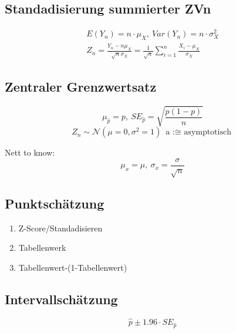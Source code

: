 \documentclass[10pt,a4paper,landscape]{article}
\begin{document}
\begin{multicols}{4}
\subsection{Standadisierung summierter ZVn}
\begin{align*}
E(Y_n) = n \cdot \mu_X, ~ Var(Y_n)= n \cdot \sigma_X^2 \\
Z_n = \frac{Y_n - n\mu_X}{\sqrt{n}\sigma_X}=\frac{1}{\sqrt{n}}\sum_{i=1}^n \frac{X_i-\mu_X}{\sigma_X}
\end{align*}

\subsection{Zentraler Grenzwertsatz}
\[
\mu_{\hat{p}}=p, ~SE_{\hat{p}}=\sqrt{\frac{p(1-p)}{n}}
\]
\[
Z_n \sim \mathcal{N}(\mu = 0, \sigma^2 = 1) ~ \text{a :$\cong$ asymptotisch}
\]

Nett to know:
\[
\mu_x = \mu, ~ \sigma_x = \frac{\sigma}{\sqrt{n}}
\]

\subsection{Punktschätzung}
\begin{enumerate}
\item Z-Score/Standadisieren
\item Tabellenwerk
\item Tabellenwert-(1-Tabellenwert)
\end{enumerate}

\subsection{Intervallschätzung}
\[
\hat{p} \pm 1.96 \cdot SE_{\hat{p}}
\]

\end{multicols}
\end{document}
